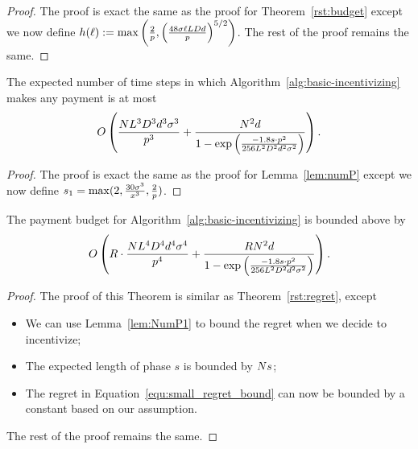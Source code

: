 \begin{proof}
The proof is exact the same as the proof for Theorem~\ref{rst:budget} except we now define $h(\ell) := \max \left( \frac{2}{p},
\left( \frac{48 \sigma \ell L D d}{p} \right)^{5/2}
\right)$. The rest of the proof remains the same.
\end{proof}


\begin{lemma}  \label{lem:NumP1}
The expected number of time steps in which
Algorithm~\ref{alg:basic-incentivizing}
makes any payment is at most 
\begin{align}
O\left(\frac{N L^3 D^3 d^3 \sigma^3}{p^3}
  + \frac{N^2 d}{1 - \exp \left(
    \frac{-1.8 s \cdot p^2}{256 L^2 D^2 d^2 \sigma^2}
  \right)} \right). \nonumber 
\end{align}
\end{lemma}

\begin{proof}
The proof is exact the same as the proof for Lemma~\ref{lem:numP} except we now define $s_1 = \max (2, \frac{30 \sigma^3}{x^3}, \frac{2}{p})$.
\end{proof}


\begin{theorem}
The payment budget for Algorithm~\ref{alg:basic-incentivizing} is bounded above by 
\begin{align}
O \left(R\cdot \frac{N L^4 D^4 d^4 \sigma^4}{p^4}
  + \frac{R N^2 d}{1 - \exp \left(
    \frac{-1.8 s \cdot p^2}{256 L^2 D^2 d^2 \sigma^2}
  \right)} \right).  \nonumber
\end{align}
\end{theorem}

\begin{proof}
The proof of this Theorem is similar as Theorem~\ref{rst:regret}, except
\begin{itemize}
\item We can use Lemma~\ref{lem:NumP1} to bound the regret when we decide to incentivize;
\item The expected length of phase $s$ is bounded by $N s$;
\item The regret in Equation~\ref{equ:small_regret_bound} can now be bounded by a constant based on our assumption.
\end{itemize}
The rest of the proof remains the same.
\end{proof}




